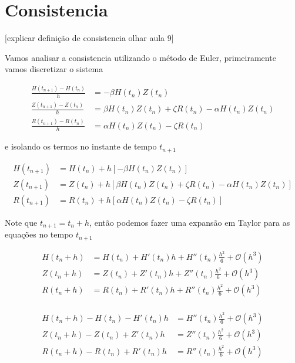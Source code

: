 \documentclass[a4paper, 11pt]{article}
\begin{document}
\section{Consistencia}

[explicar definição de consistencia olhar aula 9]

Vamos analisar a consistencia utilizando o método de Euler, primeiramente vamos discretizar o sistema

\begin{align*}
    \frac{H(t_{n+1}) - H(t_n)}{h} &= -\beta H(t_n) Z(t_n)\\
    \frac{Z(t_{n+1}) - Z(t_n)}{h} &= \beta H(t_n) Z(t_n) + \zeta R(t_n) - \alpha H(t_n) Z(t_n)\\
    \frac{R(t_{n+1}) - R(t_n)}{h} &= \alpha H(t_n) Z(t_n) - \zeta R(t_n)
\end{align*}

e isolando os termos no instante de tempo $t_{n+1}$

\begin{align*}
    H(t_{n+1}) &=  H(t_n)  + h[-\beta H(t_n) Z(t_n)]\\
    Z(t_{n+1}) &=  Z(t_n) + h[\beta H(t_n) Z(t_n) + \zeta R(t_n) - \alpha H(t_n) Z(t_n)]\\
    R(t_{n+1}) &= R(t_n) + h[\alpha H(t_n) Z(t_n) - \zeta R(t_n)]
\end{align*}

Note que $t_{n+1} = t_n + h$, então podemos fazer uma expansão em Taylor para as equações no tempo $t_{n+1}$

\begin{align*}
    H(t_n + h) &= H(t_n) + H'(t_n) h + H''(t_n) \tfrac{h^2}{6} + \mathcal O (h^3)\\
    Z(t_n + h) &= Z(t_n) + Z'(t_n) h + Z''(t_n) \tfrac{h^2}{6} + \mathcal O (h^3)\\
    R(t_n + h) &= R(t_n) + R'(t_n) h + R''(t_n) \tfrac{h^2}{6} + \mathcal O (h^3)\\
\end{align*}

\begin{align*}
    H(t_n + h) - H(t_n) - H'(t_n) h&=  H''(t_n) \tfrac{h^2}{6} + \mathcal O (h^3)\\
    Z(t_n + h) - Z(t_n) + Z'(t_n) h&= Z''(t_n) \tfrac{h^2}{6} + \mathcal O (h^3)\\
    R(t_n + h) - R(t_n) + R'(t_n) h&=  R''(t_n) \tfrac{h^2}{6} + \mathcal O (h^3)\\
\end{align*}
\end{document}
